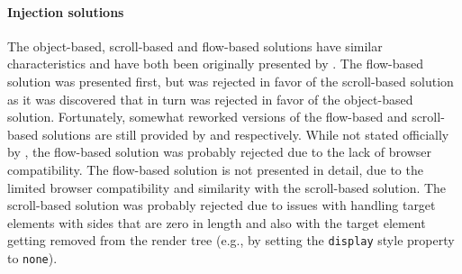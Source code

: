 \documentclass[a4paper,11pt]{kth-mag}
\newcommand{\code}[1]{\texttt{#1}}
\begin{document}
        \paragraph{Injection solutions}
        The object-based, scroll-based and flow-based solutions have similar characteristics and have both been originally presented by \cite{backalley}.
        The flow-based solution was presented first, but was rejected in favor of the scroll-based solution as it was discovered that in turn was rejected in favor of the object-based solution.
        Fortunately, somewhat reworked versions of the flow-based and scroll-based solutions are still provided by \cite{eq_imp_prollyfill-min-width} and \cite{eq_imp_css-element-queries} respectively.
        While not stated officially by \cite{backalley}, the flow-based solution was probably rejected due to the lack of \gls{browser} compatibility.
        The flow-based solution is not presented in detail, due to the limited \gls{browser} compatibility and similarity with the scroll-based solution.
        The scroll-based solution was probably rejected due to issues with handling target \glspl{element} with sides that are zero in length and also with the target element getting removed from the \gls{render tree} (e.g., by setting the \code{display} style property to \code{none}).
\end{document}
